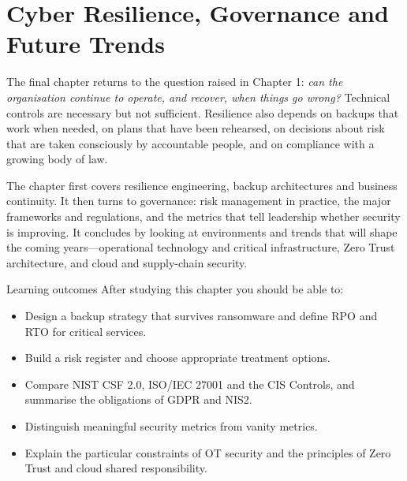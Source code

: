 \chapter{Cyber Resilience, Governance and Future Trends}\label{ch:13}

The final chapter returns to the question raised in Chapter 1: \emph{can the organisation continue to operate, and recover, when things go wrong?} Technical controls are necessary but not sufficient. Resilience also depends on backups that work when needed, on plans that have been rehearsed, on decisions about risk that are taken consciously by accountable people, and on compliance with a growing body of law.

The chapter first covers resilience engineering, backup architectures and business continuity. It then turns to governance: risk management in practice, the major frameworks and regulations, and the metrics that tell leadership whether security is improving. It concludes by looking at environments and trends that will shape the coming years—operational technology and critical infrastructure, Zero Trust architecture, and cloud and supply-chain security.

\begin{outcomesbox}{Learning outcomes}
After studying this chapter you should be able to:
\begin{itemize}
  \item Design a backup strategy that survives ransomware and define RPO and RTO for critical services.
  \item Build a risk register and choose appropriate treatment options.
  \item Compare NIST CSF 2.0, ISO/IEC 27001 and the CIS Controls, and summarise the obligations of GDPR and NIS2.
  \item Distinguish meaningful security metrics from vanity metrics.
  \item Explain the particular constraints of OT security and the principles of Zero Trust and cloud shared responsibility.
\end{itemize}
\end{outcomesbox}

